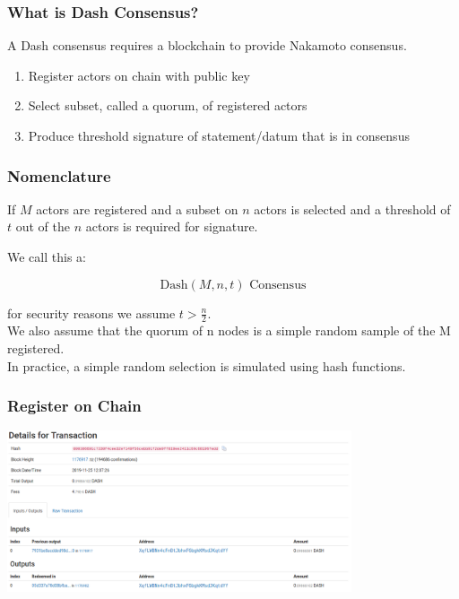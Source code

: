 \documentclass[english,handout]{beamer}
\begin{document}
\begin{frame}
\frametitle{What is Dash Consensus?}

A Dash consensus requires a blockchain to provide Nakamoto consensus.

\begin{enumerate}
\item<2> Register actors on chain with public key
\item<3> Select subset, called a quorum, of registered actors
\item<4> Produce threshold signature of statement/datum that is in consensus
\end{enumerate}

\end{frame}

\begin{frame}
\frametitle{Nomenclature}

\begin{center}
If $M$ actors are registered and a subset on $n$ actors is selected and a
threshold of $t$ out of the $n$ actors is required for signature.
\end{center}
We call this a:

\[
\textrm{Dash}(M,n,t) \textrm{ Consensus}
\]

for security reasons we assume $t>\frac{n}{2}$.\\
We also assume that the quorum of n nodes is a simple
random sample of the M registered.\\
In practice, a simple random selection is simulated using hash functions.


\end{frame}

\begin{frame}
\frametitle{Register on Chain}

\begin{center}
\includegraphics[width=4in]{Reg_tx.png}
\end{center}

\end{frame}
\end{document}
